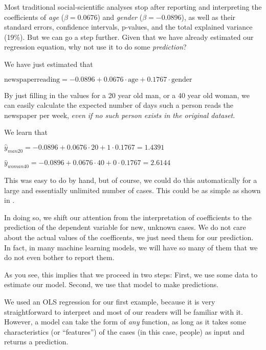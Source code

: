 
Most traditional social-scientific analyses stop after reporting and
interpreting the coefficients of \emph{age} ($\beta = 0.0676$) and \emph{gender} ($\beta = -0.0896$), as well as their standard errors, confidence intervals, p-values, and the total explained variance (19\%).
But we can go a step further. Given that we have already estimated our
regression equation, why not use it to do some \textit{prediction}?

We have just estimated that

$\textrm{newspaperreading} = -0.0896 + 0.0676 \cdot \textrm{age} + 0.1767 \cdot \textrm{gender}$

By just filling in the values for a 20 year old man, or a 40 year old
woman, we can easily calculate the expected number of days such a
person reads the newspaper per week, \emph{even if no such person
  exists in the original dataset}.

We learn that

$\hat{y}_{man20} = -0.0896 + 0.0676 \cdot 20 + 1 \cdot 0.1767 = 1.4391$

$\hat{y}_{woman40} = -0.0896 + 0.0676 \cdot 40 + 0 \cdot 0.1767 = 2.6144$

This was easy to do by hand, but of course, we could do this automatically for a large and essentially unlimited number of cases.
This could be as simple as shown in .


In doing so, we shift our attention from the interpretation of coefficients to the prediction of the dependent variable for new, unknown cases. We do not
care about the actual values of the coefficents, we just need them for our prediction.
In fact, in many machine learning models, we will have so many of them that
we do not even bother to report them.

As you see, this implies that we proceed in two steps: First, we use some data
to estimate our model. Second, we use that model to make predictions.

We used an OLS regression for our first example, because it is very
straightforward to interpret and most of our readers will be familiar
with it.  However, a model can take the form of \emph{any} function,
as long as it takes some characteristics (or ``features'') of the
cases (in this case, people) as input and returns a prediction.

